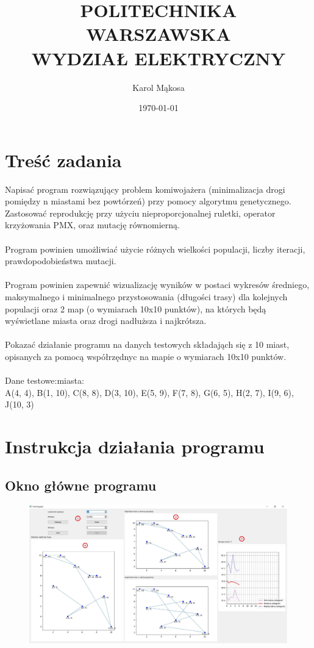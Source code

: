 \documentclass[a4paper,11pt]{article}
\title{POLITECHNIKA WARSZAWSKA \\ WYDZIAŁ ELEKTRYCZNY \\}
\author{Karol Mąkosa}
\date{\today}
\begin{document}
	\thispagestyle{empty}
	\maketitle
	\date{}
	\section{Treść zadania}
	Napisać program rozwiązujący problem komiwojażera (minimalizacja drogi pomiędzy n miastami bez powtórzeń) przy pomocy algorytmu genetycznego. Zastosować reprodukcję przy użyciu nieproporcjonalnej ruletki, operator krzyżowania PMX, oraz mutację równomierną.\\~\\
	Program powinien umożliwiać użycie różnych wielkości populacji, liczby iteracji, prawdopodobieństwa mutacji.\\~\\
	Program powinien zapewnić wizualizację wyników w postaci wykresów średniego, maksymalnego i minimalnego przystosowania (długości trasy) dla kolejnych populacji oraz 2 map (o wymiarach 10x10 punktów), na których będą wyświetlane miasta oraz drogi nadłuższa i najkrótsza.\\~\\
	Pokazać działanie programu na danych testowych składająch się z 10 miast, opisanych za pomocą współrzędnyc na mapie o wymiarach 10x10 punktów.\\~\\
	Dane testowe:miasta:\\
	A(4, 4), B(1, 10), C(8, 8), D(3, 10), E(5, 9), F(7, 8), G(6, 5), H(2, 7), I(9, 6), J(10, 3)
	\section{Instrukcja działania programu}
		\subsection{Okno główne programu}
			\begin{figure}[H]
				\centering
				\includegraphics[scale=0.5]{okno.jpg}
			\end{figure}
		\newpage
\end{document}
